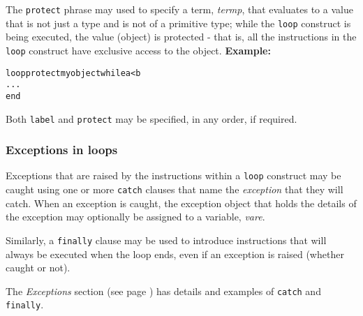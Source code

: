 The \texttt{protect} phrase may used to specify a term,
\emph{termp}, that evaluates to a value that is not just a type and
is not of a primitive type;
while the \texttt{loop} construct is being executed, the value (object)
is protected - that is, all the instructions in the \texttt{loop}
construct have exclusive access to the object.
 \textbf{Example:}
\begin{alltt}
loop protect myobject while a<b
  ...
  end
\end{alltt}
 
Both \texttt{label} and \texttt{protect} may be specified, in any order,
if required.
\subsubsection{Exceptions in loops}
 
Exceptions that are raised by the instructions within a \texttt{loop}
construct may be caught using one or more \texttt{catch} clauses that
name the \emph{exception} that they will catch.  When an exception is
caught, the exception object that holds the details of the exception may
optionally be assigned to a variable, \emph{vare}.
 
Similarly, a \texttt{finally} clause may be used to introduce
instructions that will always be executed when the loop ends, even if an
exception is raised (whether caught or not).
 
The  \emph{Exceptions} section (see page \pageref{refexcep})  has details and
examples of \texttt{catch} and \texttt{finally}.
